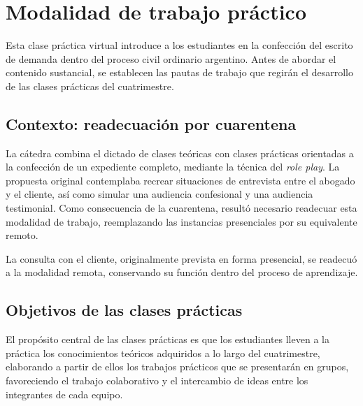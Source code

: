\documentclass[12pt,oneside]{book}
\begin{document}
\tableofcontents

\chapter{Modalidad de trabajo práctico}

Esta clase práctica virtual introduce a los estudiantes en la confección del escrito de demanda dentro del proceso civil ordinario argentino. Antes de abordar el contenido sustancial, se establecen las pautas de trabajo que regirán el desarrollo de las clases prácticas del cuatrimestre.

\section{Contexto: readecuación por cuarentena}

La cátedra combina el dictado de clases teóricas con clases prácticas orientadas a la confección de un expediente completo, mediante la técnica del \textit{role play}. La propuesta original contemplaba recrear situaciones de entrevista entre el abogado y el cliente, así como simular una audiencia confesional y una audiencia testimonial. Como consecuencia de la cuarentena, resultó necesario readecuar esta modalidad de trabajo, reemplazando las instancias presenciales por su equivalente remoto.

\begin{note}
La consulta con el cliente, originalmente prevista en forma presencial, se readecuó a la modalidad remota, conservando su función dentro del proceso de aprendizaje.
\end{note}

\section{Objetivos de las clases prácticas}

El propósito central de las clases prácticas es que los estudiantes lleven a la práctica los conocimientos teóricos adquiridos a lo largo del cuatrimestre, elaborando a partir de ellos los trabajos prácticos que se presentarán en grupos, favoreciendo el trabajo colaborativo y el intercambio de ideas entre los integrantes de cada equipo.
\end{document}
